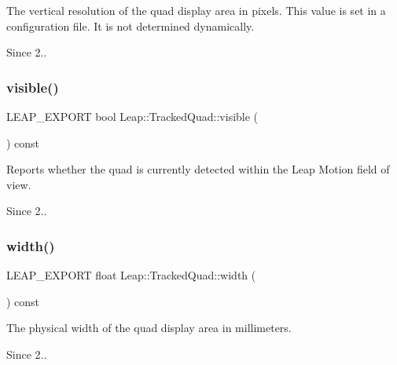 The vertical resolution of the quad display area in pixels. This value is set in a configuration file. It is not determined dynamically. 
\begin{DoxyCodeInclude}
\end{DoxyCodeInclude}
 \begin{DoxySince}{Since}
2.. 
\end{DoxySince}
\mbox{\label{class_leap_1_1_tracked_quad_ac03a01d07228515363eb81ace6cd2d99}} 
\subsubsection{\texorpdfstring{visible()}{visible()}}
{\footnotesize\ttfamily L\+E\+A\+P\+\_\+\+E\+X\+P\+O\+RT bool Leap\+::\+Tracked\+Quad\+::visible (\begin{DoxyParamCaption}{ }\end{DoxyParamCaption}) const}

Reports whether the quad is currently detected within the Leap Motion field of view. 
\begin{DoxyCodeInclude}
\end{DoxyCodeInclude}
 \begin{DoxySince}{Since}
2.. 
\end{DoxySince}
\mbox{\label{class_leap_1_1_tracked_quad_ada574f601b0b78188d61e9a47342337f}} 
\subsubsection{\texorpdfstring{width()}{width()}}
{\footnotesize\ttfamily L\+E\+A\+P\+\_\+\+E\+X\+P\+O\+RT float Leap\+::\+Tracked\+Quad\+::width (\begin{DoxyParamCaption}{ }\end{DoxyParamCaption}) const}

The physical width of the quad display area in millimeters. 
\begin{DoxyCodeInclude}
\end{DoxyCodeInclude}
 \begin{DoxySince}{Since}
2.. 
\end{DoxySince}


